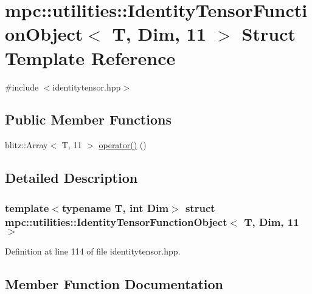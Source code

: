 \hypertarget{structmpc_1_1utilities_1_1_identity_tensor_function_object_3_01_t_00_01_dim_00_0111_01_4}{}\section{mpc\+:\+:utilities\+:\+:Identity\+Tensor\+Function\+Object$<$ T, Dim, 11 $>$ Struct Template Reference}
\label{structmpc_1_1utilities_1_1_identity_tensor_function_object_3_01_t_00_01_dim_00_0111_01_4}


{\ttfamily \#include $<$identitytensor.\+hpp$>$}

\subsection*{Public Member Functions}
\begin{DoxyCompactItemize}
\item 
blitz\+::\+Array$<$ T, 11 $>$ \mbox{\hyperlink{structmpc_1_1utilities_1_1_identity_tensor_function_object_3_01_t_00_01_dim_00_0111_01_4_a9df310361a37b1b05bc83a51b57ca686}{operator()}} ()
\end{DoxyCompactItemize}


\subsection{Detailed Description}
\subsubsection*{template$<$typename T, int Dim$>$\newline
struct mpc\+::utilities\+::\+Identity\+Tensor\+Function\+Object$<$ T, Dim, 11 $>$}



Definition at line 114 of file identitytensor.\+hpp.



\subsection{Member Function Documentation}
\mbox{\label{structmpc_1_1utilities_1_1_identity_tensor_function_object_3_01_t_00_01_dim_00_0111_01_4_a9df310361a37b1b05bc83a51b57ca686}} 
